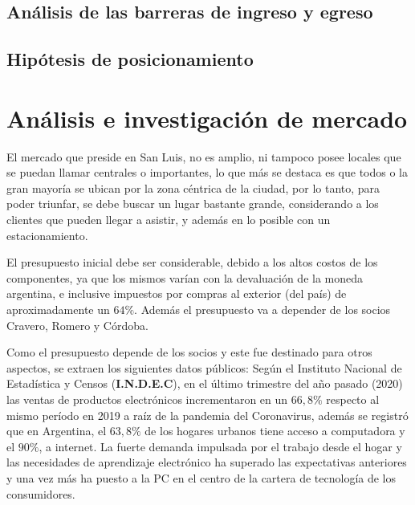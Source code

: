 \documentclass[11pt,a4paper]{article}
\begin{document}
%




\subsection{Análisis de las barreras de ingreso y egreso}


\subsection{Hipótesis de posicionamiento}



\section{Análisis e investigación de mercado}

El mercado que preside en San Luis, no es amplio, ni tampoco posee locales que se puedan llamar centrales o importantes, lo que más se destaca es que todos o la gran mayoría se ubican por la zona céntrica de la ciudad, por lo tanto, para poder triunfar, se debe buscar un lugar bastante grande, considerando a los clientes que pueden llegar a asistir, y además en lo posible con un estacionamiento.

El presupuesto inicial debe ser considerable, debido a los altos costos de los componentes, ya que los mismos varían con la devaluación de la moneda argentina, e inclusive impuestos por compras al exterior (del país) de aproximadamente un $64\%$. Además el presupuesto va a depender de los socios Cravero, Romero y Córdoba. 

Como el presupuesto depende de los socios y este fue destinado para otros aspectos, se extraen los siguientes datos públicos: Según el Instituto Nacional de Estadística y Censos (\textbf{I.N.D.E.C}), en el último trimestre del año pasado (2020) las ventas de productos electrónicos incrementaron en un $66,8\%$ respecto al mismo período en 2019 a raíz de la pandemia del Coronavirus, además se registró que en Argentina, el $63,8\%$ de los hogares urbanos tiene acceso a computadora y el $90\%$, a internet. La fuerte demanda impulsada por el trabajo desde el hogar y las necesidades de aprendizaje electrónico ha superado las expectativas anteriores y una vez más ha puesto a la PC en el centro de la cartera de tecnología de los consumidores.
\end{document}
